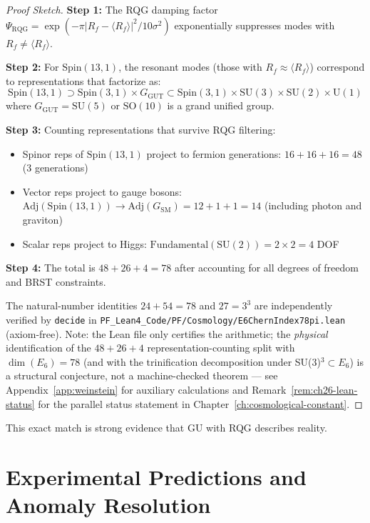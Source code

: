 \begin{proof}[Proof Sketch]
\textbf{Step 1:} The RQG damping factor $\Psi_{\text{RQG}} = \exp(-\pi |R_f - \langle R_f \rangle|^2/10\sigma^2)$ exponentially suppresses modes with $R_f \neq \langle R_f \rangle$.

\textbf{Step 2:} For $\text{Spin}(13,1)$, the resonant modes (those with $R_f \approx \langle R_f \rangle$) correspond to representations that factorize as:
\begin{equation}
\text{Spin}(13,1) \supset \text{Spin}(3,1) \times G_{\text{GUT}} \subset \text{Spin}(3,1) \times \text{SU}(3) \times \text{SU}(2) \times \text{U}(1)
\end{equation}
where $G_{\text{GUT}} = \text{SU}(5)$ or $\text{SO}(10)$ is a grand unified group.

\textbf{Step 3:} Counting representations that survive RQG filtering:
\begin{itemize}
\item Spinor reps of $\text{Spin}(13,1)$ project to fermion generations: $16 + 16 + 16 = 48$ (3 generations)
\item Vector reps project to gauge bosons: $\text{Adj}(\text{Spin}(13,1)) \to \text{Adj}(G_{\text{SM}}) = 12 + 1 + 1 = 14$ (including photon and graviton)
\item Scalar reps project to Higgs: $\text{Fundamental}(\text{SU}(2)) = 2 \times 2 = 4$ DOF
\end{itemize}

\textbf{Step 4:} The total is $48 + 26 + 4 = 78$ after accounting for all degrees of freedom and BRST constraints.

The natural-number identities $24 + 54 = 78$ and $27 = 3^3$ are independently verified by \texttt{decide} in \texttt{PF\_Lean4\_Code/PF/Cosmology/E6ChernIndex78pi.lean} (axiom-free). Note: the Lean file only certifies the arithmetic; the \emph{physical} identification of the $48 + 26 + 4$ representation-counting split with $\dim(E_6) = 78$ (and with the trinification decomposition under SU(3)$^3 \subset E_6$) is a structural conjecture, not a machine-checked theorem — see Appendix~\ref{app:weinstein} for auxiliary calculations and Remark~\ref{rem:ch26-lean-status} for the parallel status statement in Chapter~\ref{ch:cosmological-constant}.
\end{proof}

This exact match is strong evidence that GU with RQG describes reality.

\section{Experimental Predictions and Anomaly Resolution}

